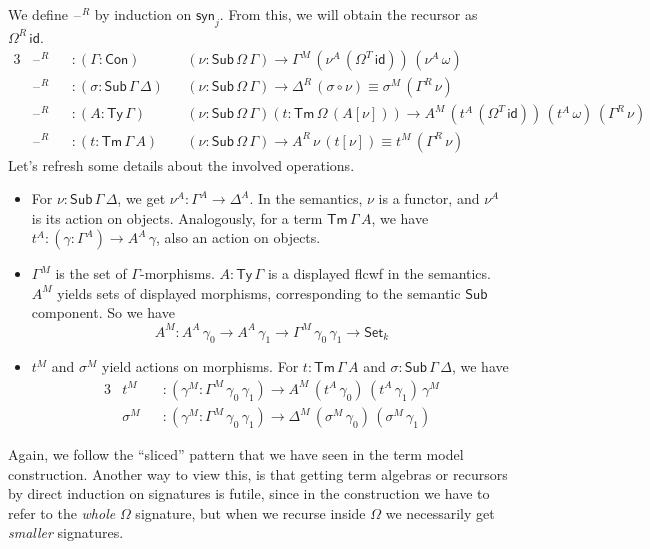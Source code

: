 \documentclass[12pt,a4paper,twoside,openany]{book}
\theoremstyle{remark}
\theoremstyle{definition}
\theoremstyle{theorem}
\newcommand{\id}{\mathsf{id}}
\newcommand{\Con}{\mathsf{Con}}
\newcommand{\Sub}{\mathsf{Sub}}
\newcommand{\Tm}{\mathsf{Tm}}
\newcommand{\Ty}{\mathsf{Ty}}
\newcommand{\blank}{\mathord{\hspace{1pt}\text{--}\hspace{1pt}}}
\newcommand{\Set}{\mathsf{Set}}
\newcommand{\syn}{\mathsf{syn}}
\begin{document}

We define $\blank^R$ by induction on $\syn_j$. From this, we will obtain the
recursor as $\Omega^R\,\id$.
\begin{alignat*}{3}
  &\blank^R &&: (\Gamma : \Con)&&(\nu : \Sub\,\Omega\,\Gamma) \to \Gamma^M\,(\nu^A\,(\Omega^T\,\id))\,(\nu^A\,\omega)\\
  &\blank^R &&: (\sigma : \Sub\,\Gamma\,\Delta)&&(\nu : \Sub\,\Omega\,\Gamma) \to \Delta^R\,(\sigma \circ \nu) \equiv \sigma^M\,(\Gamma^R\,\nu)\\
  &\blank^R &&: (A : \Ty\,\Gamma)&&(\nu : \Sub\,\Omega\,\Gamma)(t : \Tm\,\Omega\,(A[\nu]))
     \to A^M\,(t^A\,(\Omega^T\,\id))\,(t^A\,\omega)\,(\Gamma^R\,\nu)\\
  &\blank^R &&: (t : \Tm\,\Gamma\,A)&&(\nu : \Sub\,\Omega\,\Gamma) \to A^R\,\nu\,(t[\nu]) \equiv t^M\,(\Gamma^R\,\nu)
\end{alignat*}
Let's refresh some details about the involved operations.
\begin{itemize}
\item For $\nu : \Sub\,\Gamma\,\Delta$, we get $\nu^A : \Gamma^A \to \Delta^A$. In the semantics, $\nu$
  is a functor, and $\nu^A$ is its action on objects. Analogously, for a term $\Tm\,\Gamma\,A$, we
  have $t^A : (\gamma : \Gamma^A) \to A^A\,\gamma$, also an action on objects.
\item
  $\Gamma^M$ is the set of $\Gamma$-morphisms. $A : \Ty\,\Gamma$ is a displayed
  flcwf in the semantics. $A^M$ yields sets of displayed morphisms,
  corresponding to the semantic $\Sub$ component. So we have
  \[ A^M : A^A\,\gamma_0 \to A^A\,\gamma_1 \to \Gamma^M\,\gamma_0\,\gamma_1 \to \Set_{k} \]
\item $t^M$ and $\sigma^M$ yield actions on morphisms. For $t : \Tm\,\Gamma\,A$ and $\sigma : \Sub\,\Gamma\,\Delta$, we have
  \begin{alignat*}{3}
    &t^M      &&: (\gamma^M : \Gamma^M\,\gamma_0\,\gamma_1) \to A^M\,(t^A\,\gamma_0)\,(t^A\,\gamma_1)\,\gamma^M\\
    &\sigma^M &&: (\gamma^M : \Gamma^M\,\gamma_0\,\gamma_1) \to \Delta^M\,(\sigma^M\,\gamma_0)\,(\sigma^M\,\gamma_1)
  \end{alignat*}
\end{itemize}

Again, we follow the ``sliced'' pattern that we have seen in the term model
construction. Another way to view this, is that getting term algebras or
recursors by direct induction on signatures is futile, since in the
construction we have to refer to the \emph{whole} $\Omega$ signature, but when
we recurse inside $\Omega$ we necessarily get \emph{smaller} signatures.
\end{document}
